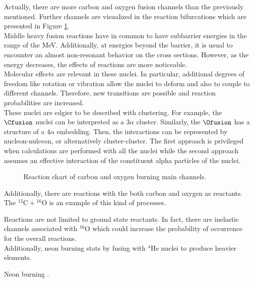 \documentclass[openany]{book}
\begin{document}
Actually, there are more carbon and oxygen fusion channels than the previously mentioned. Further channels are visualized in the reaction bifurcations which are presented in Figure \ref{fig:COchannels}. \\

Middle heavy fusion reactions have in common to have subbarrier energies in the range of the MeV. Additionally, at energies beyond the barrier, it is usual to encounter an almost non-resonant behavior on the cross sections. However, as the energy decreases, the effects of reactions are more noticeable. \\

Molecular effects are relevant in these nuclei. In particular, additional degrees of freedom like rotation or vibration allow the nuclei to deform and also to couple to different channels. Therefore, new transitions are possible and reaction probabilities are increased. \\

These nuclei are edgier to be described with clustering. For example, the $\Cfusion$ nuclei can be interpreted as a $3\alpha$ cluster. Similarly, the $\Ofusion$ has a structure of a $4\alpha$ embedding. Then, the interactions can be represented by nucleon-nulceon, or alternatively cluster-cluster. The first approach is privileged when calculations are performed with all the nuclei while the second approach assumes an effective interaction of the constituent alpha particles of the nuclei.  \\

\begin{figure}[H]
	
	\caption[Carbon and oxygen burning main channels.]{Reaction chart of carbon and oxygen burning main channels.}
	\label{fig:COchannels}
\end{figure}


Additionally, there are reactions with the both carbon and oxygen as reactants. The $\mathrm{{}^{12}C + {}^{16}O}$ is an example of this kind of processes. 

Reactions are not limited to ground state reactants. In fact, there are inelastic channels associated with $\mathrm{{}^{16}O}$ which could increase the probability of occurrence for the overall reactions.  \\

Additionally, neon burning stats by fusing with $\mathrm{{}^{4}He}$ nuclei to produce heavier elements.

 Neon burning \cite{arnett_1974}. \\
 
\end{document}
